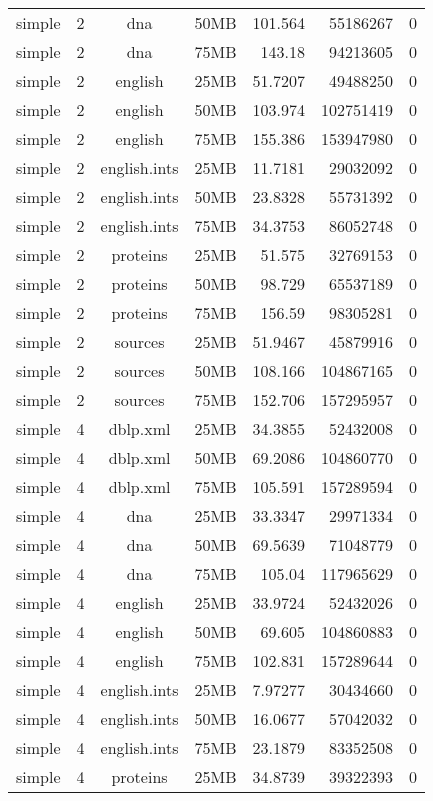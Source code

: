 \begin{table}[h]
\begin{center}
\begin{tabular}{ccccrrr}
simple & 2 & dna & 50MB & 101.564 & 55186267 & 0 \\
simple & 2 & dna & 75MB & 143.18 & 94213605 & 0 \\
simple & 2 & english & 25MB & 51.7207 & 49488250 & 0 \\
simple & 2 & english & 50MB & 103.974 & 102751419 & 0 \\
simple & 2 & english & 75MB & 155.386 & 153947980 & 0 \\
simple & 2 & english.ints & 25MB & 11.7181 & 29032092 & 0 \\
simple & 2 & english.ints & 50MB & 23.8328 & 55731392 & 0 \\
simple & 2 & english.ints & 75MB & 34.3753 & 86052748 & 0 \\
simple & 2 & proteins & 25MB & 51.575 & 32769153 & 0 \\
simple & 2 & proteins & 50MB & 98.729 & 65537189 & 0 \\
simple & 2 & proteins & 75MB & 156.59 & 98305281 & 0 \\
simple & 2 & sources & 25MB & 51.9467 & 45879916 & 0 \\
simple & 2 & sources & 50MB & 108.166 & 104867165 & 0 \\
simple & 2 & sources & 75MB & 152.706 & 157295957 & 0 \\
simple & 4 & dblp.xml & 25MB & 34.3855 & 52432008 & 0 \\
simple & 4 & dblp.xml & 50MB & 69.2086 & 104860770 & 0 \\
simple & 4 & dblp.xml & 75MB & 105.591 & 157289594 & 0 \\
simple & 4 & dna & 25MB & 33.3347 & 29971334 & 0 \\
simple & 4 & dna & 50MB & 69.5639 & 71048779 & 0 \\
simple & 4 & dna & 75MB & 105.04 & 117965629 & 0 \\
simple & 4 & english & 25MB & 33.9724 & 52432026 & 0 \\
simple & 4 & english & 50MB & 69.605 & 104860883 & 0 \\
simple & 4 & english & 75MB & 102.831 & 157289644 & 0 \\
simple & 4 & english.ints & 25MB & 7.97277 & 30434660 & 0 \\
simple & 4 & english.ints & 50MB & 16.0677 & 57042032 & 0 \\
simple & 4 & english.ints & 75MB & 23.1879 & 83352508 & 0 \\
simple & 4 & proteins & 25MB & 34.8739 & 39322393 & 0 \\

\end{tabular}
\end{center}
\end{table}

